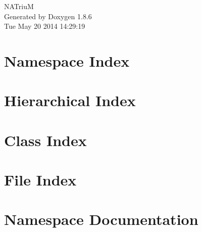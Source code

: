 \documentclass[twoside]{book}
\newcommand{\clearemptydoublepage}{%
  \newpage{\pagestyle{empty}\cleardoublepage}%
}
\begin{document}
\hypersetup{pageanchor=false}
\begin{titlepage}
\vspace*{7cm}
\begin{center}%
{\Large N\-A\-Triu\-M }\\
\vspace*{1cm}
{\large Generated by Doxygen 1.8.6}\\
\vspace*{0.5cm}
{\small Tue May 20 2014 14:29:19}\\
\end{center}
\end{titlepage}
\clearemptydoublepage
\tableofcontents
\clearemptydoublepage
{}
\hypersetup{pageanchor=true}

\chapter{Namespace Index}

\chapter{Hierarchical Index}

\chapter{Class Index}

\chapter{File Index}

\chapter{Namespace Documentation}

\end{document}
